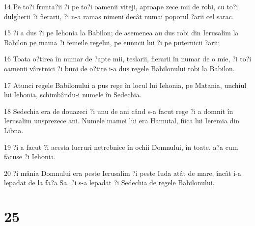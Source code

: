\par 14 Pe to?i frunta?ii ?i pe to?i oamenii viteji, aproape zece mii de robi, cu to?i dulgherii ?i fierarii, ?i n-a ramas nimeni decât numai poporul ?arii cel sarac.
\par 15 ?i a dus ?i pe Iehonia la Babilon; de asemenea au dus robi din Ierusalim la Babilon pe mama ?i femeile regelui, pe eunucii lui ?i pe puternicii ?arii;
\par 16 Toata o?tirea în numar de ?apte mii, teslarii, fierarii în numar de o mie, ?i to?i oamenii vârstnici ?i buni de o?tire i-a dus regele Babilonului robi la Babilon.
\par 17 Atunci regele Babilonului a pus rege în locul lui Iehonia, pe Matania, unchiul lui Iehonia, schimbându-i numele în Sedechia.
\par 18 Sedechia era de douazeci ?i unu de ani când s-a facut rege ?i a domnit în Ierusalim unsprezece ani. Numele mamei lui era Hamutal, fiica lui Ieremia din Libna.
\par 19 ?i a facut ?i acesta lucruri netrebnice în ochii Domnului, în toate, a?a cum facuse ?i Iehonia.
\par 20 ?i mânia Domnului era peste Ierusalim ?i peste Iuda atât de mare, încât i-a lepadat de la fa?a Sa. ?i s-a lepadat ?i Sedechia de regele Babilonului.

\chapter{25}

